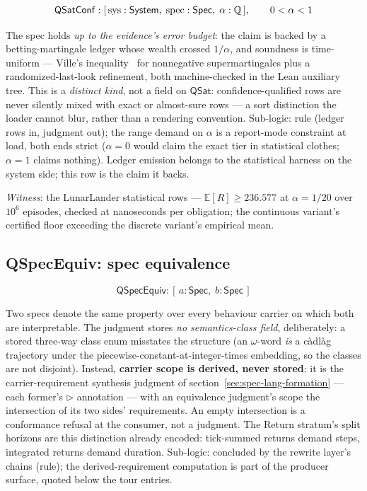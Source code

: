 \[
\mathsf{QSatConf} : [\, \mathrm{sys} : \mathsf{System},\;
  \mathrm{spec} : \mathsf{Spec},\;
  \alpha : \mathbb{Q} \,],
\qquad 0 < \alpha < 1
\]

The spec holds \emph{up to the evidence's error budget}: the claim is
backed by a betting-martingale ledger whose wealth crossed
$1/\alpha$, and soundness is time-uniform --- Ville's
inequality~\cite{ville1939} for nonnegative supermartingales plus a
randomized-last-look refinement, both machine-checked in the Lean
auxiliary tree. This is a \emph{distinct kind}, not a field on
$\mathsf{QSat}$: confidence-qualified rows are never silently mixed
with exact or almost-sure rows --- a sort distinction the loader
cannot blur, rather than a rendering convention. Sub-logic: rule
(ledger rows in, judgment out); the range demand on $\alpha$ is a
report-mode constraint at load, both ends strict ($\alpha = 0$
would claim the exact tier in statistical clothes; $\alpha = 1$
claims nothing). Ledger emission belongs to the statistical harness
on the system side; this row is the claim it backs.

\emph{Witness}: the LunarLander statistical rows ---
$\mathbb{E}[R] \ge 236.577$ at $\alpha = 1/20$ over $10^6$ episodes,
checked at nanoseconds per obligation; the continuous variant's
certified floor exceeding the discrete variant's empirical mean.



\subsection{QSpecEquiv: spec equivalence}
\label{sec:spec-lang-qspecequiv}

\[
\mathsf{QSpecEquiv} : [\, a : \mathsf{Spec},\; b : \mathsf{Spec} \,]
\]

Two specs denote the same property over every behaviour carrier on
which both are interpretable. The judgment stores \emph{no
semantics-class field}, deliberately: a stored three-way class enum
misstates the structure (an $\omega$-word \emph{is} a c\`adl\`ag
trajectory under the piecewise-constant-at-integer-times embedding,
so the classes are not disjoint). Instead, \textbf{carrier scope is
derived, never stored}: it is the carrier-requirement synthesis
judgment of section~\ref{sec:spec-lang-formation} --- each former's
$\rhd$ annotation --- with an equivalence judgment's scope the
intersection of its two sides' requirements. An empty intersection
is a conformance refusal at the consumer, not a judgment. The
Return stratum's split horizons are this distinction already
encoded: tick-summed returns demand steps, integrated returns demand
duration.
Sub-logic: concluded by the rewrite layer's chains (rule);
the derived-requirement computation is part of the producer surface,
quoted below the tour entries.

